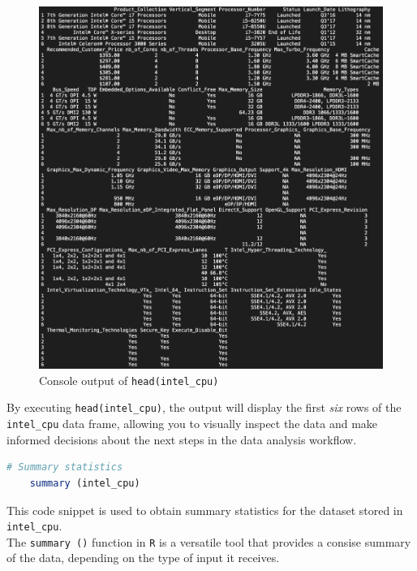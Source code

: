 \begin{figure}[H]
    \centering
    \includegraphics[width=14cm]{graphics/head.png}
    \caption*{Console output of \texttt{head(intel\_cpu)}}
\end{figure}

By executing \texttt{head(intel\_cpu)}, the output will display the first \textit{six} rows of the \texttt{intel\_cpu} data frame, allowing you to visually inspect the data and make informed decisions about the next steps in the data analysis workflow.

\newpage

\begin{lstlisting}[language=R]
    # Summary statistics
    summary (intel_cpu)
\end{lstlisting}

This code snippet is used to obtain summary statistics for the dataset stored in \texttt{intel\_cpu}.\\

The \texttt{summary ()} function in \texttt{R} is a versatile tool that provides a consise summary of the data, depending on the type of input it receives.

